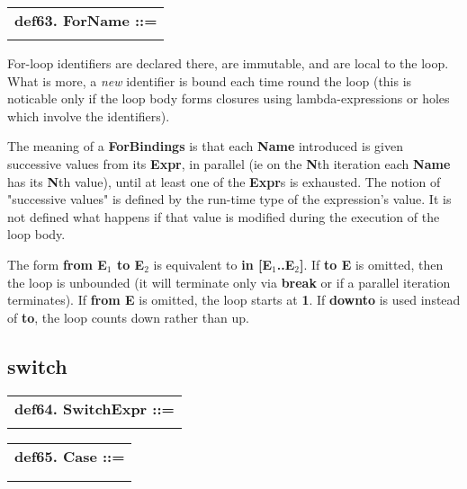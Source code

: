 \documentclass{report}
\begin{document}
\begin{tabular}{l}
{\bf def63. ForName ::= }\\ 
\hspace*{3mm}{\tt Name {[}(TypeWord Type){]}} \\ 
\end{tabular}



For-loop identifiers are declared there, are immutable, and are local
to the loop. What is more, a {\em new} identifier is bound each time round
the loop (this is noticable only if the loop body forms closures using
lambda-expressions or holes which involve the identifiers).

The meaning of a {\bf ForBindings} is that each {\bf Name} introduced is given
successive values from its {\bf Expr}, in parallel (ie on the {\bf N}th iteration each
{\bf Name} has its {\bf N}th value), until at least one of the {\bf Expr}s is exhausted.
The notion of "successive values" is defined by the run-time type of the
expression's value. It is not defined what happens if that value is modified
during the execution of the loop body.

The form {\bf from E$_ 1$ to E$_ 2$} is equivalent to {\bf in {[}E$_ 1$..E$_ 2${]}}. If {\bf to E} is
omitted, then the loop is unbounded (it will terminate only via {\bf break} or if
a parallel iteration terminates). If {\bf from E} is omitted, the loop starts at
{\bf 1}. If {\bf downto} is used instead of {\bf to}, the loop counts down rather than up.

\subsection{switch}


\begin{tabular}{l}
{\bf def64. SwitchExpr ::= }\\ 
\hspace*{3mm}{\tt "switch" Expr Case+ "endswitch"} \\ 
\end{tabular}



\begin{tabular}{l}
{\bf def65. Case ::= }\\ 
\hspace*{3mm}{\tt ("case" Expr)+ "then" StatementSeq} \\ 
\hspace*{3mm}{\tt  $\mid$ "else" StatementSeq} \\ 
\end{tabular}
\end{document}
